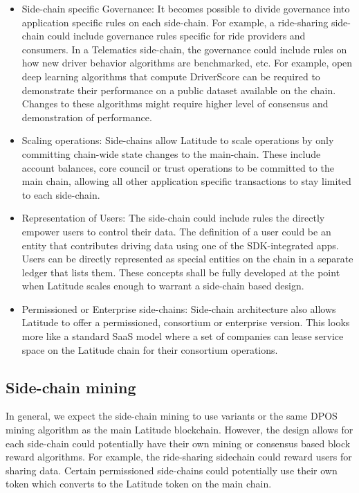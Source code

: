 \begin{itemize}
  \item Side-chain specific Governance: It becomes possible to divide governance into application specific rules on
        each side-chain. For example, a ride-sharing side-chain could include governance rules specific for ride
        providers and consumers. In a Telematics side-chain, the governance could include rules on how new driver
        behavior algorithms are benchmarked, etc.  For example, open deep learning algorithms that compute DriverScore
        can be required to demonstrate their performance on a public dataset available on the chain. Changes to these
        algorithms might require higher level of consensus and demonstration of performance.

  \item Scaling operations: Side-chains allow Latitude to scale operations by only committing chain-wide state changes
      to the main-chain. These include account balances, core council or trust operations to be committed to the main
        chain, allowing all other application specific transactions to stay limited to each side-chain.
   \item Representation of Users: The side-chain could include rules the directly empower users to control their data.  The definition of a
user could be an entity that contributes driving data using one of the SDK-integrated apps.  Users can be directly
represented as special entities on the chain in a separate ledger that lists them. These concepts shall be fully
developed at the point when Latitude scales enough to warrant a side-chain based design.

  \item Permissioned or Enterprise side-chains: Side-chain architecture also allows Latitude to offer a permissioned,
      consortium or enterprise version. This looks more like a standard SaaS model where a set of companies can lease
        service space on the Latitude chain for their consortium operations.
\end{itemize}

\subsection{Side-chain mining}
In general, we expect the side-chain mining to use variants or the same DPOS mining algorithm as the main Latitude
blockchain.  However, the design allows for each side-chain could potentially have their own mining or consensus based
block reward algorithms. For example, the ride-sharing sidechain could reward users for sharing data. Certain
permissioned side-chains could potentially use their own token which converts to the Latitude token on the main chain.

